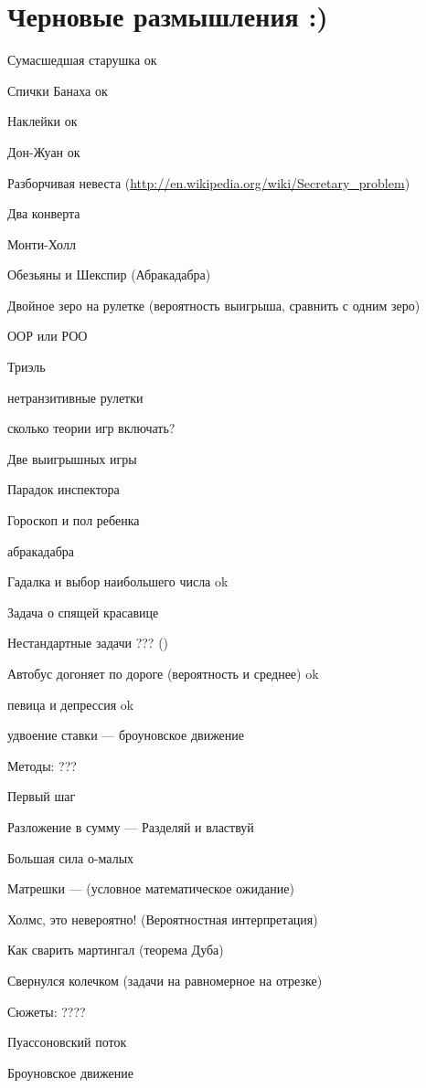 \documentclass[12pt,a4paper]{article}
\begin{document}
\section{Черновые размышления :)}

Сумасшедшая старушка  ок

Спички Банаха  ок

Наклейки ок

Дон-Жуан ок

Разборчивая невеста (\url{http://en.wikipedia.org/wiki/Secretary_problem})

Два конверта

Монти-Холл

Обезьяны и Шекспир (Абракадабра)

Двойное зеро на рулетке (вероятность выигрыша, сравнить с одним зеро)

ООР или РОО

Триэль

нетранзитивные рулетки

сколько теории игр включать? 

Две выигрышных игры

Парадок инспектора

Гороскоп и пол ребенка

абракадабра

Гадалка и выбор наибольшего числа ok 

Задача о спящей красавице


Нестандартные задачи ??? ()

Автобус догоняет по дороге (вероятность и среднее) ok

певица и депрессия ok

удвоение ставки --- броуновское движение


Методы: ???

Первый шаг

Разложение в сумму --- Разделяй и властвуй

Большая сила о-малых

Матрешки --- (условное математическое ожидание)

Холмс, это невероятно! (Вероятностная интерпретация)

Как сварить мартингал (теорема Дуба)

Свернулся колечком (задачи на равномерное на отрезке)


Сюжеты: ????

Пуассоновский поток

Броуновское движение
\end{document}
